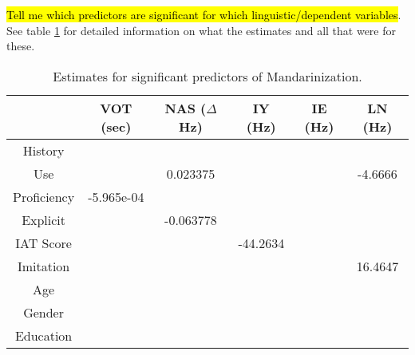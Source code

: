\hl{Tell me which predictors are significant for which linguistic/dependent variables}. See table \ref{tab:sigGenPredEsts} for detailed information on what the estimates and all that were for these.

\begin{table}[]
    \centering
    \begin{tabular}{|c|c|c|c|c|c|}
        \hline
         & VOT (sec) & NAS ($\Delta$Hz) & IY (Hz) & IE (Hz) & LN (Hz)\\
        \hline
        History & \cellcolor{lightgray} & \cellcolor{lightgray} & \cellcolor{lightgray} & \cellcolor{lightgray} & \cellcolor{lightgray} \\
        \hline
        Use & \cellcolor{lightgray} & 0.023375 & \cellcolor{lightgray} & \cellcolor{lightgray} & -4.6666 \\
        \hline
        Proficiency & -5.965e-04 & \cellcolor{lightgray} & \cellcolor{lightgray} & \cellcolor{lightgray} & \cellcolor{lightgray} \\
        \hline
        Explicit & \cellcolor{lightgray} & -0.063778 & \cellcolor{lightgray} & \cellcolor{lightgray} & \cellcolor{lightgray} \\
        \hline
        IAT Score & \cellcolor{lightgray} & \cellcolor{lightgray} & -44.2634 & \cellcolor{lightgray} & \cellcolor{lightgray} \\
        \hline
        Imitation & \cellcolor{lightgray} & \cellcolor{lightgray} & \cellcolor{lightgray} & \cellcolor{lightgray} & 16.4647 \\
        \hline
        Age & \cellcolor{lightgray} & \cellcolor{lightgray} & \cellcolor{lightgray} & \cellcolor{lightgray} & \cellcolor{lightgray} \\
        \hline
        Gender & \cellcolor{lightgray} & \cellcolor{lightgray} & \cellcolor{lightgray} & \cellcolor{lightgray} & \cellcolor{lightgray} \\
        \hline
        Education & \cellcolor{lightgray} & \cellcolor{lightgray} & \cellcolor{lightgray} & \cellcolor{lightgray} & \cellcolor{lightgray} \\
        \hline
    \end{tabular}
    \caption{Estimates for significant predictors of Mandarinization.}
    \label{tab:sigGenPredEsts}
\end{table}

